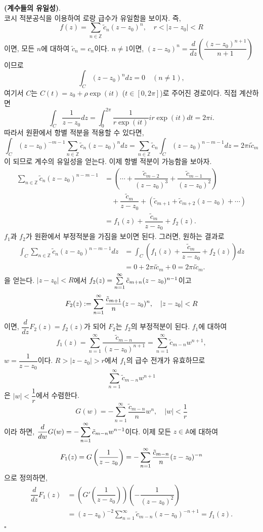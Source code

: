 {\bf (계수들의 유일성)}. \\[1ex]
코시 적분공식을 이용하여 로랑 급수가 유일함을 보이자. 즉,
\[
f(z) = \sum_{n\in\mathbb Z} \tilde c_n(z-z_0)^n, \quad
r < |z-z_0| <R
\]
이면, 모든 $n$에 대하여 $\tilde c_n = c_n$이다.
$n\ne 1$이면, $(z-z_0)^n = \dfrac d{dz} \left( \dfrac{(z-z_0)^{n+1}}{n+1} \right)$이므로
\[
\int_C (z-z_0)^n dz = 0 \quad (n\ne1),
\]
여기서 $C$는 $C(t)=z_0 + \rho\exp(it)$ ($t\in[0,2\pi]$)로 주어진 경로이다.
직접 계산하면
\[
\int_C \dfrac1{z-z_0} dz = \int_0^{2\pi} \dfrac1{r\exp(it)}ir\exp(it)dt = 2\pi i.
\]
따라서 원환에서 항별 적분을 적용할 수 있다면,
\[
\int_C (z-z_0)^{-m-1} \sum_{n\in\mathbb Z} \tilde c_n (z-z_0)^n dz
= \sum_{n\in\mathbb Z} \tilde c_n \int_C (z-z_0)^{n-m-1} dz = 2\pi i \tilde c_m
\]
이 되므로 계수의 유일성을 얻는다.
이제 항별 적분이 가능함을 보아자.
\begin{align*}
 \sum_{n\in\mathbb Z} \tilde c_n (z-z_0)^{n-m-1}
 &= \left( \cdots + \dfrac{\tilde c_{m-2}}{(z-z_0)^3} +  \dfrac{\tilde c_{m-1}}{(z-z_0)^2} \right) \\
 & \quad + \dfrac{\tilde c_m}{z-z_0} + (\tilde c_{m+1} + \tilde c_{m+2}(z-z_0) + \cdots) \\
 & = f_1(z) + \dfrac{\tilde c_m}{z-z_0} + f_2(z).
\end{align*}
$f_1$과 $f_2$가 원환에서 부정적분을 가짐을 보이면 된다. 그러면, 원하는 결과로
\begin{align*}
\int_C  \sum_{n\in\mathbb Z} \tilde c_n (z-z_0)^{n-m-1} dz
&= \int_C \left( f_1(z) + \dfrac{\tilde c_m}{z-z_0} + f_2(z) \right) dz \\
&= 0 + 2\pi i \tilde c_m + 0 = 2\pi i \tilde c_m.
\end{align*}
을 얻는다.
$|z-z_0|<R$에서 $f_2(z) = \sum\limits_{n=1}^\infty \tilde c_{m+n} (z-z_0)^{n-1}$이고
\[
F_2(z) := \sum\limits_{n=1}^\infty \displaystyle\frac{\tilde c_{m+1}}n (z-z_0)^n,
\quad |z-z_0|<R
\]
이면, $\dfrac d{dz} F_2(z) = f_2(z)$가 되어 $F_2$는 $f_2$의 부정적분이 된다.
$f_1$에 대하여 
\[
f_1(z) = \sum_{n=1}^\infty \dfrac{\tilde c_{m-n}}{(z-z_0)^{n+1}} 
= \sum_{n=1}^\infty \tilde c_{m-n} w^{n+1},
\]
$w = \dfrac1{z-z_0}$이다. $R>|z-z_0| >r$에서 $f_1$의 급수 전개가 유효하므로
\[
\sum_{n=1}^\infty \tilde c_{m-n} w^{n+1}
\]
은 $|w|<\dfrac1r$에서 수렴한다. 
\[
G(w) = - \sum_{n=1}^\infty \dfrac{\tilde c_{m-n}}n w^n,\quad
|w|<\dfrac1r
\]
이라 하면, $\displaystyle\frac d{dw} G(w) = - \sum\limits_{n=1}^\infty \tilde c_{m-n} w^{n-1}$이다. 
이제 모든 $z\in \mathbb A$에 대하여
\[
F_1(z) = G\left(\displaystyle\frac1{z-z_0}\right) 
= - \sum\limits_{n=1}^\infty\displaystyle\frac{\tilde c_{m-n}}n (z-z_0)^{-n}
\]
으로 정의하면,
\begin{align*}
\dfrac d{dz} F_1(z)
&= \left( G'\left(\dfrac1{z-z_0}\right)\right) \left(- \dfrac1{(z-z_0)^2}\right) \\
&= (z-z_0)^{-2} \sum_{n=1}^\infty \tilde c_{m-n} (z-z_0)^{-n+1} = f_1(z).
\end{align*}
\hfill $\square$

